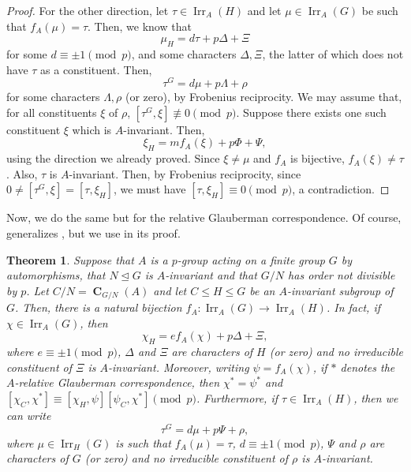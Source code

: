 \documentclass[12pt]{amsart}
\DeclareMathOperator{\CB}{\mathbf{C}}
\DeclareMathOperator{\Irr}{Irr}
\theoremstyle{remark}
\theoremstyle{definition}
\theoremstyle{plain}
\newtheorem{thm}{Theorem}[section]
\theoremstyle{definition}
\numberwithin{equation}{section}
\begin{document}
\begin{proof}
	For the other direction, let $\tau \in \Irr_{A}(H)$ and let $\mu \in \Irr_{A}(G)$ be such that $f_A(\mu) = \tau$. Then, we know that
	\begin{equation*}
		\mu_H = d\tau + p\Delta + \Xi
	\end{equation*}
	for some $d \equiv \pm 1 \pmod{p}$, and some characters $\Delta, \Xi$, the latter of which does not have $\tau$ as a constituent. Then,
	\begin{equation*}
		\tau^G = d\mu + p\Lambda + \rho
	\end{equation*}
	for some characters $\Lambda, \rho$ (or zero), by Frobenius reciprocity. We may assume that, for all constituents $\xi$ of $\rho$, $[\tau^G, \xi] \not \equiv 0 \pmod{p}$. Suppose there exists one such constituent $\xi$ which is $A$-invariant. Then,
	\begin{equation*}
		\xi_H = mf_A(\xi) + p\Phi + \Psi,
	\end{equation*}
	using the direction we already proved. Since $\xi \neq \mu$ and $f_A$ is bijective, $f_A(\xi) \neq \tau$. Also, $\tau$ is $A$-invariant. Then, by Frobenius reciprocity, since $0 \neq [\tau^G, \xi] = [\tau, \xi_H]$, we must have $[\tau, \xi_H] \equiv 0 \pmod{p}$, a contradiction.
\end{proof}

Now, we do the same but for the relative Glauberman correspondence. Of course,  generalizes , but we use  in its proof.

\begin{thm}
	\label{relativeCorrespondence}
	Suppose that $A$ is a $p$-group acting on a finite group $G$ by automorphisms, that $N \unlhd G$ is $A$-invariant and that $G/N$ has order not divisible by $p$. Let $C/N = \CB_{G/N}(A)$ and let $C \leq H \leq G$ be an $A$-invariant subgroup of $G$. Then, there is a natural bijection $f_A: \Irr_A(G) \to \Irr_A(H)$. In fact, if $\chi \in \Irr_A(G)$, then
	\begin{equation*}
		\chi_H = ef_A(\chi) + p\Delta + \Xi,
	\end{equation*}
	where $e \equiv \pm 1 \pmod{p}$, $\Delta$ and $\Xi$ are characters of $H$ (or zero) and no irreducible constituent of $\Xi$ is $A$-invariant. Moreover, writing $\psi = f_A(\chi)$, if $*$ denotes the $A$-relative Glauberman correspondence, then $\chi^* = \psi^*$ and $[\chi_C, \chi^*] \equiv [\chi_H, \psi][\psi_C, \chi^*] \pmod{p}$. Furthermore, if $\tau \in \Irr_A(H)$, then we can write
	\begin{equation*}
		\tau^G = d \mu + p\Psi + \rho,
	\end{equation*}
	where $\mu \in \Irr_H(G)$ is such that $f_A(\mu) = \tau$, $d \equiv \pm 1 \pmod{p}$, $\Psi$ and $\rho$ are characters of $G$ (or zero) and no irreducible constituent of $\rho$ is $A$-invariant.
\end{thm}
\end{document}
